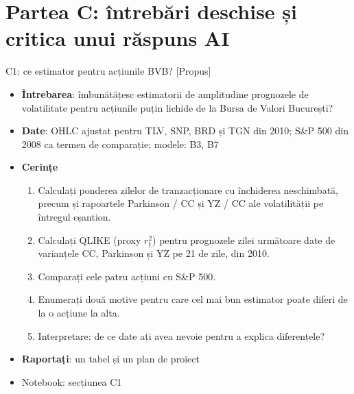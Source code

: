 \section{Partea C: întrebări deschise și critica unui răspuns AI}

\begin{frame}{C1: ce estimator pentru acțiunile BVB? [Propus]}
\itemsize{\footnotesize}
\begin{itemize}
\item \textbf{Întrebarea}: îmbunătățesc estimatorii de amplitudine prognozele de volatilitate pentru acțiunile puțin lichide de la Bursa de Valori București?
\item \textbf{Date}: OHLC ajustat pentru TLV, SNP, BRD și TGN din 2010; S\&P 500 din 2008 ca termen de comparație; modele: B3, B7
\item \textbf{Cerințe}
\begin{enumerate}
    \item Calculați ponderea zilelor de tranzacționare cu închiderea neschimbată, precum și rapoartele Parkinson / CC și YZ / CC ale volatilității pe întregul eșantion.
    \item Calculați QLIKE (proxy $r_t^2$) pentru prognozele zilei următoare date de varianțele CC, Parkinson și YZ pe 21 de zile, din 2010.
    \item Comparați cele patru acțiuni cu S\&P 500.
    \item Enumerați două motive pentru care cel mai bun estimator poate diferi de la o acțiune la alta.
    \item Interpretare: de ce date ați avea nevoie pentru a explica diferențele?
\end{enumerate}
\item \textbf{Raportați}: un tabel și un plan de proiect
\item Notebook: secțiunea C1
\end{itemize}
\end{frame}

